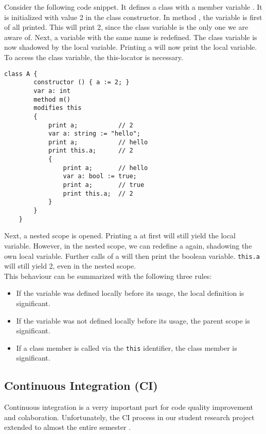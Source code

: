 Consider the following code snippet. It defines a class with a member variable . It is initialized with value 2 in the class constructor. In method , the variable  is first of all printed. This will print 2, since the class variable is the only one we are aware of. Next, a variable with the same name is redefined. The class variable is now shadowed by the local variable. Printing a will now print the local variable. To access the class variable, the this-locator is necessary.

\begin{lstlisting}[caption={Complex Shadowing Example}, captionpos=b, label={lst:shadowing}]
    class A {
        constructor () { a := 2; }
        var a: int
        method m() 
        modifies this
        {
            print a;           // 2
            var a: string := "hello";
            print a;           // hello
            print this.a;      // 2
            {
                print a;       // hello
                var a: bool := true;
                print a;       // true
                print this.a;  // 2
            }
        }
    }
\end{lstlisting}

Next, a nested scope is opened. Printing a at first will still yield the local variable. However, in the nested scope, we can redefine a again, shadowing the own local variable. Further calls of a will then print the boolean variable. \texttt{this.a} will still yield 2, even in the nested scope.\\

This behaviour can be summarized with the following three rules:
\begin{itemize}
    \item If the variable was defined locally before its usage, the local definition is significant.
    \item If the variable was not defined locally before its usage, the parent scope is significant.
    \item If a class member is called via the \texttt{this} identifier, the class member is significant.
\end{itemize}



    










\subsection{Continuous Integration (CI)}
Continuous integration is a verry important part for code quality improvement and colaboration.
Unfortunately, the CI process in our student research project extended to almost the entire semester \cite{sa}. \\

